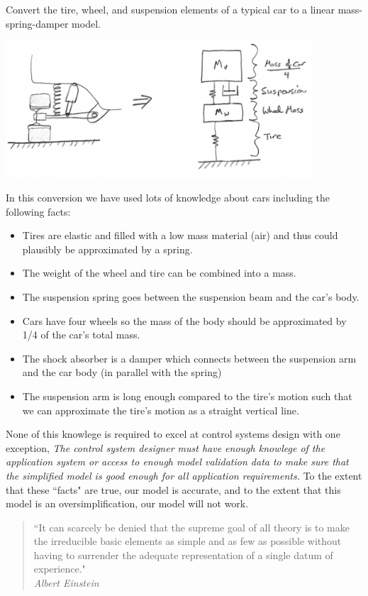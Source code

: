 \begin{Example}\label{ExampleCarSuspension}

Convert the tire, wheel, and suspension elements of a typical car to a linear mass-spring-damper model.


\includegraphics[width=4.5in]{figs02/00719a.png}


In this conversion we have used lots of knowledge about cars including the following facts:


 \begin{itemize}
   \item Tires are elastic and filled with a low mass material (air) and thus could plausibly be approximated by a spring.
   \item The weight of the wheel and tire can be combined into a mass.
   \item The suspension spring goes between the suspension beam and the car's body.
   \item Cars have four wheels so the mass of the body should be approximated by 1/4 of the car's total mass.
   \item The shock absorber is a damper which connects between the suspension arm and the car body (in parallel with the spring)
   \item The suspension arm is long enough compared to the tire's motion such that we can approximate the tire's motion as a straight vertical line.
 \end{itemize}


None of this knowlege is required to excel at control systems design with one exception, {\it The control system designer must have enough knowlege of the application system or access to enough model validation data to make sure that the simplified model is good enough for all application requirements. } To the extent that these ``facts" are true, our model is accurate, and to the extent that this model is an oversimplification, our model will not work.


\begin{quotation}``It can scarcely be denied that the supreme goal of all theory is to make the irreducible basic elements as simple and as few as possible without having to surrender the adequate representation of a single datum of experience." \\
{\it Albert Einstein}
\end{quotation}

\end{Example}


